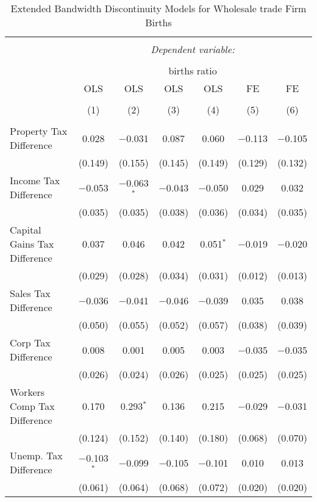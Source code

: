 
\begin{table}[!htbp] \centering 
  \caption{Extended Bandwidth Discontinuity Models for  Wholesale trade Firm Births} 
  \label{42eb} 
\begin{tabular}{@{\extracolsep{5pt}}lcccccc} 
\\[-1.8ex]\hline 
\hline \\[-1.8ex] 
 & \multicolumn{6}{c}{\textit{Dependent variable:}} \\ 
\cline{2-7} 
\\[-1.8ex] & \multicolumn{6}{c}{births ratio} \\ 
 & OLS & OLS & OLS & OLS & FE & FE \\ 
\\[-1.8ex] & (1) & (2) & (3) & (4) & (5) & (6)\\ 
\hline \\[-1.8ex] 
 Property Tax Difference & 0.028 & $-$0.031 & 0.087 & 0.060 & $-$0.113 & $-$0.105 \\ 
  & (0.149) & (0.155) & (0.145) & (0.149) & (0.129) & (0.132) \\ 
  Income Tax Difference & $-$0.053 & $-$0.063$^{*}$ & $-$0.043 & $-$0.050 & 0.029 & 0.032 \\ 
  & (0.035) & (0.035) & (0.038) & (0.036) & (0.034) & (0.035) \\ 
  Capital Gains Tax Difference & 0.037 & 0.046 & 0.042 & 0.051$^{*}$ & $-$0.019 & $-$0.020 \\ 
  & (0.029) & (0.028) & (0.034) & (0.031) & (0.012) & (0.013) \\ 
  Sales Tax Difference & $-$0.036 & $-$0.041 & $-$0.046 & $-$0.039 & 0.035 & 0.038 \\ 
  & (0.050) & (0.055) & (0.052) & (0.057) & (0.038) & (0.039) \\ 
  Corp Tax Difference & 0.008 & 0.001 & 0.005 & 0.003 & $-$0.035 & $-$0.035 \\ 
  & (0.026) & (0.024) & (0.026) & (0.025) & (0.025) & (0.025) \\ 
  Workers Comp Tax Difference & 0.170 & 0.293$^{*}$ & 0.136 & 0.215 & $-$0.029 & $-$0.031 \\ 
  & (0.124) & (0.152) & (0.140) & (0.180) & (0.068) & (0.070) \\ 
  Unemp. Tax Difference & $-$0.103$^{*}$ & $-$0.099 & $-$0.105 & $-$0.101 & 0.010 & 0.013 \\ 
  & (0.061) & (0.064) & (0.068) & (0.072) & (0.020) & (0.020) \\ 

\end{tabular}
\end{table}
